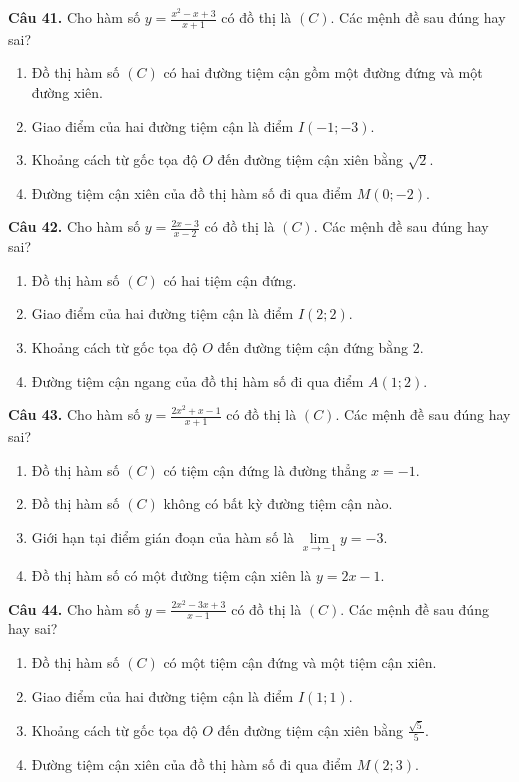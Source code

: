 \documentclass[12pt]{article}
\begin{document}
	
	\vspace{0.4cm}
	\noindent \textbf{Câu 41.} Cho hàm số $y = \frac{x^2 - x + 3}{x + 1}$ có đồ thị là $(C)$. Các mệnh đề sau đúng hay sai?
	\begin{enumerate}[label=\textbf{\alph*)}]
		\item Đồ thị hàm số $(C)$ có hai đường tiệm cận gồm một đường đứng và một đường xiên.  
		\item Giao điểm của hai đường tiệm cận là điểm $I(-1; -3)$.  
		\item Khoảng cách từ gốc tọa độ $O$ đến đường tiệm cận xiên bằng $\sqrt{2}$.  
		\item Đường tiệm cận xiên của đồ thị hàm số đi qua điểm $M(0; -2)$.  
	\end{enumerate}
	
	\vspace{0.4cm}
	\noindent \textbf{Câu 42.} Cho hàm số $y = \frac{2x - 3}{x - 2}$ có đồ thị là $(C)$. Các mệnh đề sau đúng hay sai?
	\begin{enumerate}[label=\textbf{\alph*)}]
		\item Đồ thị hàm số $(C)$ có hai tiệm cận đứng.  
		\item Giao điểm của hai đường tiệm cận là điểm $I(2; 2)$.  
		\item Khoảng cách từ gốc tọa độ $O$ đến đường tiệm cận đứng bằng $2$.  
		\item Đường tiệm cận ngang của đồ thị hàm số đi qua điểm $A(1; 2)$.  
	\end{enumerate}
	
	\vspace{0.4cm}
	\noindent \textbf{Câu 43.} Cho hàm số $y = \frac{2x^2 + x - 1}{x + 1}$ có đồ thị là $(C)$. Các mệnh đề sau đúng hay sai?
	\begin{enumerate}[label=\textbf{\alph*)}]
		\item Đồ thị hàm số $(C)$ có tiệm cận đứng là đường thẳng $x = -1$.  
		\item Đồ thị hàm số $(C)$ không có bất kỳ đường tiệm cận nào.  
		\item Giới hạn tại điểm gián đoạn của hàm số là $\lim\limits_{x \to -1} y = -3$.  
		\item Đồ thị hàm số có một đường tiệm cận xiên là $y = 2x - 1$.  
	\end{enumerate}
	
	\vspace{0.4cm}
	\noindent \textbf{Câu 44.} Cho hàm số $y = \frac{2x^2 - 3x + 3}{x - 1}$ có đồ thị là $(C)$. Các mệnh đề sau đúng hay sai?
	\begin{enumerate}[label=\textbf{\alph*)}]
		\item Đồ thị hàm số $(C)$ có một tiệm cận đứng và một tiệm cận xiên.  
		\item Giao điểm của hai đường tiệm cận là điểm $I(1; 1)$.  
		\item Khoảng cách từ gốc tọa độ $O$ đến đường tiệm cận xiên bằng $\frac{\sqrt{5}}{5}$.  
		\item Đường tiệm cận xiên của đồ thị hàm số đi qua điểm $M(2; 3)$.  
	\end{enumerate}
	
\end{document}
